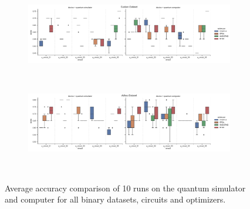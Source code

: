 \begin{figure}[!ht]
\begin{subfigure}{1.0\textwidth}
        \centering
        \includegraphics[width=1.0\linewidth]{thesis/Figures/qnn/boxplots/100_custom.png}
        \label{subfigure:accuracy_comparison_boxplots_custom_dataset1}
    \end{subfigure}
    \\[-3ex]
    \begin{subfigure}{1.0\textwidth}
        \centering
        \includegraphics[width=1.0\linewidth]{thesis/Figures/qnn/boxplots/100_adhoc.png}
        \label{subfigure:accuracy_comparison_boxplots_adhoc_dataset1}
    \end{subfigure}
    \\[-3ex]
    \caption{Average accuracy comparison of 10 runs on the quantum simulator and computer for all binary datasets, circuits and optimizers.}
    \label{figure:accuracy_comparison_boxplots_binary_datasets}
\end{figure}


\clearpage

